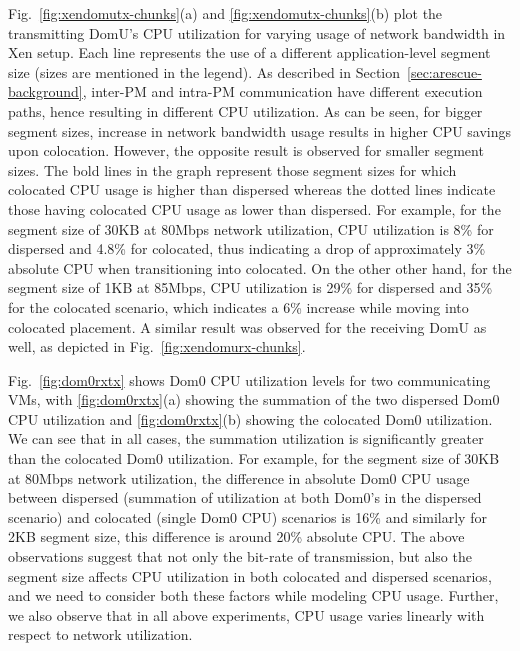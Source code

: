 Fig.~\ref{fig:xendomutx-chunks}(a) and \ref{fig:xendomutx-chunks}(b)
plot the transmitting DomU's CPU utilization for varying usage
of network bandwidth in Xen setup. Each line represents
the use of a different application-level segment size
(sizes are mentioned in the legend).
As described in Section~\ref{sec:arescue-background}, inter-PM and
intra-PM communication have different execution paths,
hence resulting in different CPU utilization.
As can be seen, for bigger segment sizes, increase
in network bandwidth usage results in higher CPU savings upon
colocation. However, the opposite result is
observed for smaller segment sizes.
The bold lines in the graph represent those
segment sizes for which colocated CPU usage is higher than
dispersed whereas the dotted lines indicate those having
colocated CPU usage as lower than dispersed. For example,
for the segment size of 30KB at 80Mbps network utilization,
CPU utilization is 8\% for dispersed and 4.8\% for colocated,
thus indicating a drop of approximately 3\% absolute CPU
when transitioning into colocated. On the other other hand,
for the segment size of 1KB at 85Mbps, CPU utilization
is 29\% for dispersed and 35\% for the colocated scenario,
which indicates a 6\% increase while moving into colocated placement.
A similar result was observed for the receiving DomU as well,
as depicted in Fig.~\ref{fig:xendomurx-chunks}.

Fig.~\ref{fig:dom0rxtx} shows Dom0 CPU utilization
levels for two communicating VMs,
with
\ref{fig:dom0rxtx}(a)
showing the summation of the two dispersed Dom0 CPU utilization
and
\ref{fig:dom0rxtx}(b)
showing the colocated Dom0 utilization.
We can see that in all cases,
the summation utilization is significantly greater than the
colocated Dom0 utilization. For example,
for the segment size of 30KB at 80Mbps network utilization,
the difference in absolute Dom0 CPU usage between
dispersed (summation of utilization at both Dom0's in the
dispersed scenario) and colocated (single
Dom0 CPU) scenarios is 16\% and similarly for 2KB segment size,
this difference is around 20\% absolute CPU.
The above observations suggest that not only the bit-rate of
transmission, but also the segment size affects CPU utilization
in both colocated and dispersed scenarios, and we need to consider
both these factors while modeling CPU usage. Further, we also
observe that in all above experiments, CPU usage varies linearly
with respect to network utilization.



